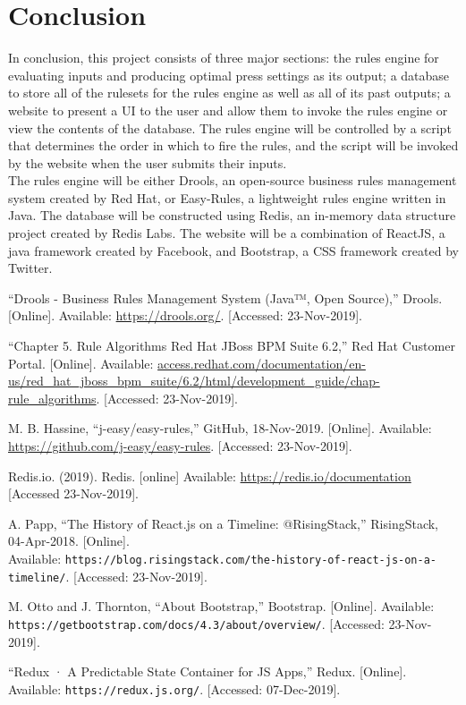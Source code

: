 \documentclass[draftclsnofoot,onecolumn,10pt,compsoc]{IEEEtran}
\begin{document}
\section{Conclusion}
In conclusion, this project consists of three major sections: the rules engine for evaluating inputs and producing optimal press settings as its output; a database to store all of the rulesets for the rules engine as well as all of its past outputs; a website to present a UI to the user and allow them to invoke the rules engine or view the contents of the database. The rules engine will be controlled by a script that determines the order in which to fire the rules, and the script will be invoked by the website when the user submits their inputs.\\[10pt]
The rules engine will be either Drools, an open-source business rules management system created by Red Hat, or Easy-Rules, a lightweight rules engine written in Java. The database will be constructed using Redis, an in-memory data structure project created by Redis Labs. The website will be a combination of ReactJS, a java framework created by Facebook, and Bootstrap, a CSS framework created by Twitter.


\vspace{30pt}
\begin{thebibliography}{9}
“Drools - Business Rules Management System (Java™, Open Source),” Drools. [Online]. Available: \url{https://drools.org/}. [Accessed: 23-Nov-2019].

“Chapter 5. Rule Algorithms Red Hat JBoss BPM Suite 6.2,” Red Hat Customer Portal. [Online]. Available: \url{access.redhat.com/documentation/en-us/red_hat_jboss_bpm_suite/6.2/html/development_guide/chap-rule_algorithms}. [Accessed: 23-Nov-2019].

M. B. Hassine, “j-easy/easy-rules,” GitHub, 18-Nov-2019. [Online]. Available: \url{https://github.com/j-easy/easy-rules}. [Accessed: 23-Nov-2019].

Redis.io. (2019). Redis. [online] Available: \url{https://redis.io/documentation} [Accessed 23-Nov-2019].

A. Papp, “The History of React.js on a Timeline: @RisingStack,” RisingStack, 04-Apr-2018. [Online].\\
Available: \texttt{https://blog.risingstack.com/the-history-of-react-js-on-a-timeline/}. [Accessed: 23-Nov-2019].

M. Otto and J. Thornton, “About Bootstrap,” Bootstrap. [Online]. Available: \texttt{https://getbootstrap.com/docs/4.3/about/overview/}. [Accessed: 23-Nov-2019].

“Redux · A Predictable State Container for JS Apps,” Redux. [Online]. Available: \texttt{https://redux.js.org/}. [Accessed: 07-Dec-2019].
\end{thebibliography}
\end{document}
